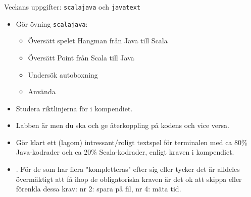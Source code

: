 


\begin{Slide}{Veckans uppgifter: \texttt{scalajava} och \texttt{javatext}}\SlideFontSmall
{}
\begin{itemize}
\item Gör övning \texttt{scalajava}:
\begin{itemize}\SlideFontSmall
\item Översätt spelet Hangman från Java till Scala
\item Översätt Point från Scala till Java
\item Undersök autoboxning 
\item Använda 
\end{itemize}
\item Studera riktlinjerna för  i kompendiet.
\item Labben är  men du ska  och ge återkoppling på kodens  och vice versa.
\end{itemize}
\begin{itemize}
\item Gör klart ett (lagom) intressant/roligt textspel för terminalen med ca 80\% Java-kodrader och ca 20\% Scala-kodrader, enligt kraven i kompendiet.
\item {}. För de som har flera "kompletteras" efter sig eller tycker
det är alldeles övermäktigt att få ihop de obligatoriska kraven är det
ok att skippa eller förenkla dessa krav: nr 2: spara på fil, nr 4: mäta tid.
\end{itemize}
\end{Slide}
